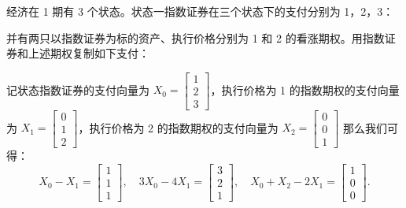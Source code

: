 \begin{problem}
 经济在 1 期有 3 个状态。状态一指数证券在三个状态下的支付分别为 1，2，3：
\begin{center}
\end{center}
并有两只以指数证券为标的资产、执行价格分别为 1 和 2 的看涨期权。用指数证券和上述期权复制如下支付：
\begin{center}
\qquad
{}
\qquad
{}
\end{center}
\end{problem}
\begin{solution}
记状态指数证券的支付向量为 $X_{0}=\begin{bmatrix}1\\2\\3\end{bmatrix}$，执行价格为 1 的指数期权的支付向量为 $X_{1}=\begin{bmatrix}0\\1\\2\end{bmatrix}$，执行价格为 2 的指数期权的支付向量为 $X_{2}=\begin{bmatrix}0\\0\\1\end{bmatrix}$ 那么我们可得：
\[
    X_{0}-X_{1}=\begin{bmatrix}1\\1\\1\end{bmatrix},\quad
    3X_{0}-4X_{1}=\begin{bmatrix}3\\2\\1\end{bmatrix},\quad
    X_{0}+X_{2}-2X_{1}=\begin{bmatrix}1\\0\\0\end{bmatrix}.
\]
\end{solution}

